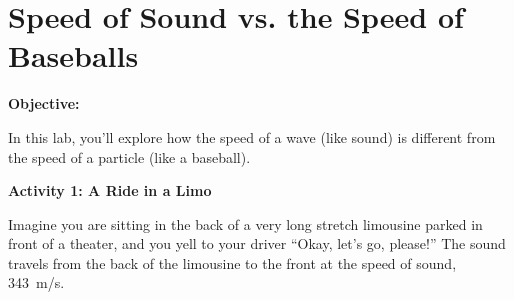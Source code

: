 \section{Speed of Sound vs. the Speed of Baseballs}

\makelabheader %

\bigskip

\textbf{Objective:}

In this lab, you'll explore how the speed of a wave (like sound) is different from the speed of a particle (like a baseball).

\bigskip

\textbf{Activity 1: A Ride in a Limo}

Imagine you are sitting in the back of a very long stretch limousine parked in front of a theater, and you yell to your driver ``Okay, let's go, please!''  The sound travels from the back of the limousine to the front at the speed of sound, 343~m/s.

